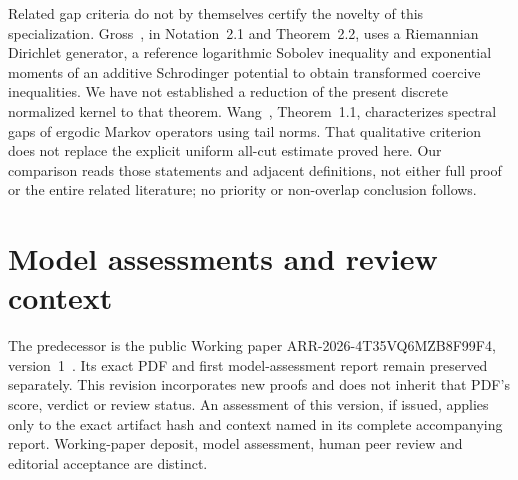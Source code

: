 \documentclass[11pt]{article}
\begin{document}
Related gap criteria do not by themselves certify the novelty of this
specialization. Gross~\cite{gross2025}, in Notation~2.1 and Theorem~2.2,
uses a Riemannian Dirichlet generator, a reference logarithmic Sobolev
inequality and exponential moments of an additive Schrodinger potential
to obtain transformed coercive inequalities. We have not established a
reduction of the present discrete normalized kernel to that theorem.
Wang~\cite{wang2013}, Theorem~1.1, characterizes spectral gaps of ergodic
Markov operators using tail norms. That qualitative criterion does not
replace the explicit uniform all-cut estimate proved here. Our comparison
reads those statements and adjacent definitions, not either full proof or
the entire related literature; no priority or non-overlap conclusion follows.
\section{Model assessments and review context}
The predecessor is the public Working paper ARR-2026-4T35VQ6MZB8F99F4, version~1~\cite{predecessor}. Its exact PDF and first model-assessment report remain preserved separately. This revision incorporates new proofs and does not inherit that PDF's score, verdict or review status. An assessment of this version, if issued, applies only to the exact artifact hash and context named in its complete accompanying report. Working-paper deposit, model assessment, human peer review and editorial acceptance are distinct.
\end{document}

